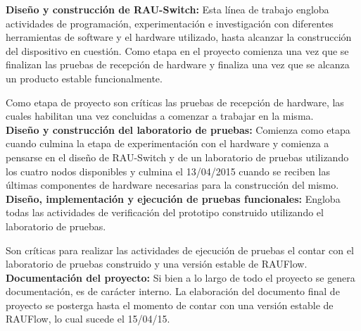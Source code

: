 \textbf{Diseño y construcci\'on de RAU-Switch:} Esta l\'inea de trabajo engloba actividades de programaci\'on, experimentaci\'on e investigaci\'on con diferentes herramientas de software y el hardware utilizado, hasta alcanzar la construcci\'on del dispositivo en cuesti\'on. Como etapa en el proyecto comienza una vez que se finalizan las pruebas de recepci\'on de hardware y finaliza una vez que se alcanza un producto estable funcionalmente.

Como etapa de proyecto son cr\'iticas las pruebas de recepci\'on de hardware, las cuales habilitan una vez concluidas a comenzar a trabajar en la misma.\\

\textbf{Diseño y construcci\'on del laboratorio de pruebas:} Comienza como etapa cuando culmina la etapa de experimentaci\'on con el hardware y comienza a pensarse en el diseño de RAU-Switch y de un laboratorio de pruebas utilizando los cuatro nodos disponibles y culmina el 13/04/2015 cuando se reciben las \'ultimas componentes de hardware necesarias para la construcci\'on del mismo.\\

\textbf{Diseño, implementaci\'on y ejecuci\'on de pruebas funcionales:} Engloba todas las actividades de verificaci\'on del prototipo construido utilizando el laboratorio de pruebas.

Son cr\'iticas para realizar las actividades de ejecuci\'on de pruebas el contar con el laboratorio de pruebas construido y una versi\'on estable de RAUFlow.\\

\textbf{Documentaci\'on del proyecto:} Si bien a lo largo de todo el proyecto se genera documentaci\'on, es de carácter interno. La elaboraci\'on del documento final de proyecto se posterga hasta el momento de contar con una versi\'on estable de RAUFlow, lo cual sucede el 15/04/15.\\